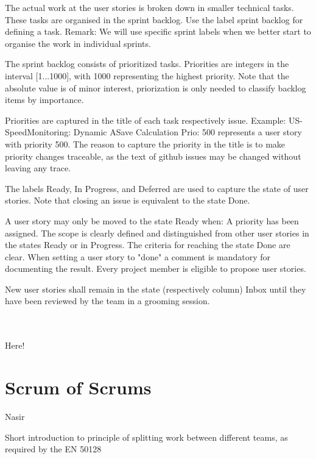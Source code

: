 The actual work at the user stories is broken down in smaller technical tasks. These tasks are organised in the sprint backlog. Use the label sprint backlog for defining a task.
Remark: We will use specific sprint labels when we better start to organise the work in individual sprints.

The sprint backlog consists of prioritized tasks. Priorities are integers in the interval [1...1000], with 1000 representing the highest priority. Note that the absolute value is of minor interest, priorization is only needed to classify backlog items by importance.

Priorities are captured in the title of each task respectively issue. Example: US-SpeedMonitoring: Dynamic ASave Calculation Prio: 500 represents a user story with priority 500. The reason to capture the priority in the title is to make priority changes traceable, as the text of github issues may be changed without leaving any trace.

The labels Ready, In Progress, and Deferred are used to capture the state of user stories. Note that closing an issue is equivalent to the state Done.

A user story may only be moved to the state Ready when:
	A priority has been assigned.
	The scope is clearly defined and distinguished from other user stories in the states Ready or in Progress.
	The criteria for reaching the state Done are clear.
	When setting a user story to "done" a comment is mandatory for documenting the result.
	Every project member is eligible to propose user stories.

New user stories shall remain in the state (respectively column) Inbox until they have been reviewed by the team in a grooming session. 





 \\ \\



Here!
\reversemarginpar
{}

\section{Scrum of Scrums}


Nasir

Short introduction to principle of splitting work between different teams, as required by the EN 50128

